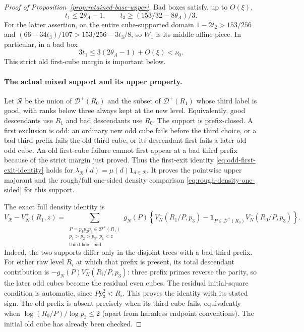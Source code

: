 \begin{proof}[Proof of Proposition~\ref{prop:retained-base-upper}]
Bad boxes satisfy, up to $O(\xi)$,
\[
 t_1\le2\theta_A-1,\qquad
 t_3\ge(153/32-8\theta_A)/3.
\]
For the latter assertion, on the entire cube-supported domain
$1-2t_2>153/256$ and
$(66-34t_3)/107>153/256-3t_3/8$, so $W_1$ is its middle
affine piece. In particular, in a bad box
\[
 3t_1\le3(2\theta_A-1)+O(\xi)<\nu_0.
\]
This strict old first-cube margin is important below.

\paragraph{The actual mixed support and its upper property.}
Let $\mathcal R$ be the union of $\mathcal D^+(R_0)$ and
the subset of $\mathcal D^+(R_1)$ whose third label is good,
with ranks below three always kept at the new level. Equivalently,
good descendants use $R_1$ and bad descendants use $R_0$.
The support is prefix-closed. A first exclusion is odd: an ordinary
new odd cube fails before the third choice, or a bad third prefix
fails the old third cube, or its descendant first fails a later old
odd cube. An old first-cube failure cannot first appear at a bad
third prefix because of the strict margin just proved.
Thus the first-exit identity \eqref{eq:odd-first-exit-identity}
holds for $\lambda_{\mathcal R}(d)=\mu(d)\mathbf1_{d\in\mathcal R}$.
It proves the pointwise upper majorant and the rough/full one-sided
density comparison \eqref{eq:rough-density-one-sided} for this support.

The exact full density identity is
\begin{equation}\label{eq:retained-base-exact-density}
 V_{\mathcal R}-V_N^+(R_1,z)
 =\sum_{\substack{P=p_1p_2p_3\in\mathcal D^+(R_1)\\
        p_1>p_2>p_3,\ p_1<z\\\text{third label bad}}}
 g_N(P)\left\{V_N^-(R_1/P,p_3)
 -\mathbf1_{P\in\mathcal D^+(R_0)}V_N^-(R_0/P,p_3)\right\}.
\end{equation}
Indeed, the two supports differ only in the disjoint trees with a
bad third prefix. For either raw level $R_i$ at which that prefix is
present, its total descendant contribution is
$-g_N(P)V_N^-(R_i/P,p_3)$: three prefix primes reverse the
parity, so the later odd cubes become the residual even cubes.
The residual initial-square condition is automatic, since
$Pp_3^2<R_i$. This proves the identity with its stated sign.
The old prefix is absent precisely when its third cube fails,
equivalently when $\log(R_0/P)/\log p_3\le2$ (apart from harmless
endpoint conventions). The initial old cube has already been checked.


\end{proof}
